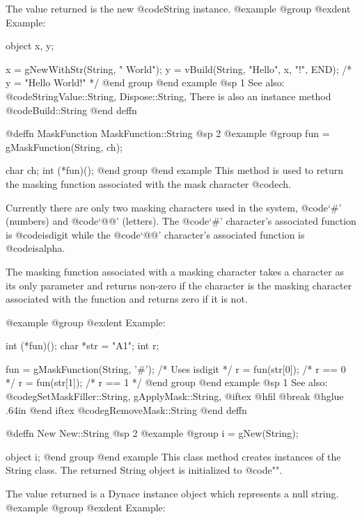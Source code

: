 The value returned is the new @code{String} instance.
@example
@group
@exdent Example:

object  x, y;

x = gNewWithStr(String, " World");
y = vBuild(String, "Hello", x, "!", END);
/*  y = "Hello World!"  */
@end group
@end example
@sp 1
See also:  @code{StringValue::String, Dispose::String,}
There is also an instance method @code{Build::String}
@end deffn





@deffn {MaskFunction} MaskFunction::String
@sp 2
@example
@group
fun = gMaskFunction(String, ch);

char    ch;
int     (*fun)();
@end group
@end example
This method is used to return the masking function associated with
the mask character @code{ch}.

Currently there are only two masking characters used in the system,
@code{`#'} (numbers) and @code{`@@'} (letters).  The @code{`#'}
character's associated function is @code{isdigit} while the @code{`@@'}
character's associated function is @code{isalpha}.

The masking function associated with a masking character takes a
character as its only parameter and returns non-zero if the character
is the masking character associated with the function and returns zero
if it is not.

@example
@group
@exdent Example:

int     (*fun)();
char    *str = "A1";
int     r;

fun = gMaskFunction(String, '#');       /*  Uses isdigit  */
r = fun(str[0]);                        /*  r == 0        */
r = fun(str[1]);                        /*  r == 1        */
@end group
@end example
@sp 1
See also:  @code{gSetMaskFiller::String, gApplyMask::String,}
@iftex
@hfil @break @hglue .64in      
@end iftex
@code{gRemoveMask::String}
@end deffn












@deffn {New} New::String
@sp 2
@example
@group
i = gNew(String);

object  i;
@end group
@end example
This class method creates instances of the String class.  The returned
String object is initialized to @code{""}.

The value returned is a Dynace instance object which represents a null string.
@example
@group
@exdent Example:

